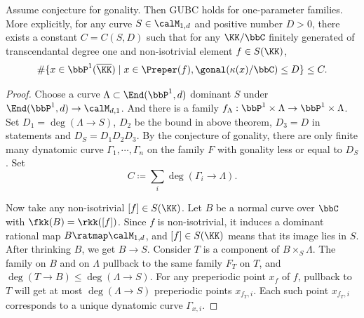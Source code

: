 \begin{lemma}
	Assume conjecture for gonality.
	Then GUBC holds for one-parameter families.
	More explicitly, for any curve $S \in \calM_{1,d}$ and positive number $D > 0$,
	there exists a constant $C = C(S,D)$ such that for any $\KK/\bbC$ finitely generated of transcendantal degree one and non-isotrivial element $f \in S(\KK)$,
	\[ \# \{ x \in \bbP^1(\overline{\KK}) \;|\; x \in \Preper(f), \gonal(\kappa(x)/\bbC) \leq D \}  \leq C. \]
\end{lemma}
\begin{proof}
	Choose a curve $\Lambda \subset \End(\bbP^1,d)$ dominant $S$ under $\End(\bbP^1,d) \to \calM_{d,1}$.
	And there is a family $f_\Lambda: \bbP^1 \times \Lambda \to \bbP^1 \times \Lambda$.
  Set $D_1 = \deg (\Lambda \to S)$, $D_2$ be the bound in above theorem, $D_3 = D$ in statements and $D_S = D_1D_2D_3$.
	By the conjecture of gonality, there are only finite many dynatomic curve $\Gamma_1, \cdots, \Gamma_n$ on the family $F$ with gonality less or equal to $D_S$.
  Set 
  \[ C \coloneqq \sum_{i} \deg (\Gamma_i \to \Lambda). \]

  Now take any non-isotrivial $[f] \in S(\KK)$.
  Let $B$ be a normal curve over $\bbC$ with $\fkk(B) = \rkk([f])$.
  Since $f$ is non-isotrivial, it induces a dominant rational map $B \ratmap \calM_{1,d}$, and $[f] \in S(\KK)$ means that its image lies in $S$. \Yang
  After thrinking $B$, we get $B \to S$.
  Consider 
  $T$ is a component of $ B \times_S \Lambda$.
  The family on $B$ and on $\Lambda$ pullback to the same family $F_T$ on $T$, and $\deg(T \to B) \leq \deg(\Lambda \to S)$.
  For any preperiodic point $x_f$ of $f$, pullback to $T$ will get at most $\deg(\Lambda \to S)$ preperiodic points $x_{f_T,i}$.
  Each such point $x_{f_T,i}$ corresponds to a unique dynatomic curve $\Gamma_{x,i}$.
\end{proof}










